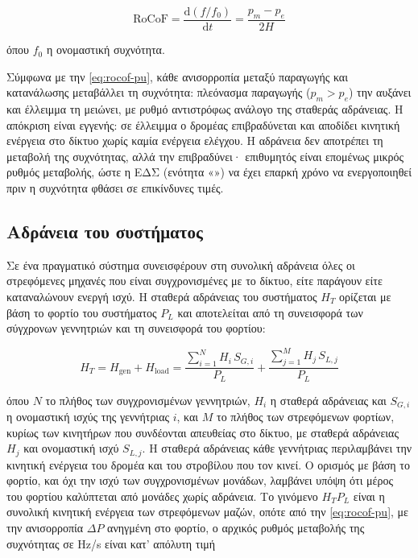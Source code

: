 \begin{equation}
\mathrm{RoCoF} = \frac{\mathrm{d}(f/f_0)}{\mathrm{d}t} = \frac{p_m - p_e}{2H}
\label{eq:rocof-pu}
\end{equation}

όπου $f_0$ η ονομαστική συχνότητα.

Σύμφωνα με την \eqref{eq:rocof-pu}, κάθε ανισορροπία μεταξύ παραγωγής και κατανάλωσης
μεταβάλλει τη συχνότητα: πλεόνασμα παραγωγής ($p_m > p_e$) την αυξάνει και έλλειμμα τη μειώνει,
με ρυθμό αντιστρόφως ανάλογο της σταθεράς αδράνειας. Η απόκριση είναι εγγενής: σε έλλειμμα ο
δρομέας επιβραδύνεται και αποδίδει κινητική ενέργεια στο δίκτυο χωρίς καμία ενέργεια ελέγχου.
Η αδράνεια δεν αποτρέπει τη μεταβολή της συχνότητας, αλλά την επιβραδύνει· επιθυμητός είναι
επομένως μικρός ρυθμός μεταβολής, ώστε η ΕΔΣ (ενότητα «») να έχει επαρκή
χρόνο να ενεργοποιηθεί πριν η συχνότητα φθάσει σε επικίνδυνες τιμές.

\subsection{Αδράνεια του συστήματος}
\label{sec:inertia-sys}

Σε ένα πραγματικό σύστημα συνεισφέρουν στη συνολική αδράνεια όλες οι στρεφόμενες μηχανές που
είναι συγχρονισμένες με το δίκτυο, είτε παράγουν είτε καταναλώνουν ενεργή ισχύ. Η σταθερά
αδράνειας του συστήματος $H_T$ ορίζεται με βάση το φορτίο του συστήματος $P_L$ και αποτελείται
από τη συνεισφορά των σύγχρονων γεννητριών και τη συνεισφορά του φορτίου:

\begin{equation}
H_T = H_{\mathrm{gen}} + H_{\mathrm{load}}
    = \frac{\sum_{i=1}^{N} H_i\,S_{G,i}}{P_L} + \frac{\sum_{j=1}^{M} H_j\,S_{L,j}}{P_L}
\label{eq:htotal}
\end{equation}

όπου $N$ το πλήθος των συγχρονισμένων γεννητριών, $H_i$ η σταθερά αδράνειας και $S_{G,i}$ η
ονομαστική ισχύς της γεννήτριας $i$, και $M$ το πλήθος των στρεφόμενων φορτίων, κυρίως των
κινητήρων που συνδέονται απευθείας στο δίκτυο, με σταθερά αδράνειας $H_j$ και ονομαστική ισχύ
$S_{L,j}$. Η σταθερά αδράνειας κάθε γεννήτριας περιλαμβάνει την κινητική ενέργεια του δρομέα
και του στροβίλου που τον κινεί. Ο ορισμός με βάση το φορτίο, και όχι την ισχύ των
συγχρονισμένων μονάδων, λαμβάνει υπόψη ότι μέρος του φορτίου καλύπτεται από μονάδες χωρίς
αδράνεια. Το γινόμενο $H_T P_L$ είναι η συνολική κινητική ενέργεια των στρεφόμενων μαζών, οπότε
από την \eqref{eq:rocof-pu}, με την ανισορροπία $\Delta P$ ανηγμένη στο φορτίο, ο αρχικός
ρυθμός μεταβολής της συχνότητας σε Hz/s είναι κατ' απόλυτη τιμή

